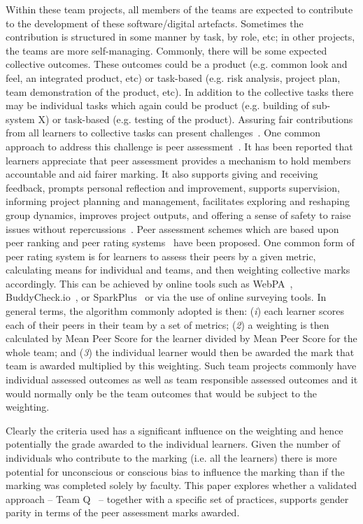 \documentclass[sigconf, anonymous=true]{acmart}
\begin{document}
Within these team projects, all members of the teams are expected to
contribute to the development of these software/digital
artefacts. Sometimes the contribution is structured in some manner by
task, by role, etc; in other projects, the teams are more
self-managing. Commonly, there will be some expected collective
outcomes. These outcomes could be a product (e.g. common look and
feel, an integrated product, etc) or task-based (e.g. risk analysis,
project plan, team demonstration of the product, etc).  In addition to
the collective tasks there may be individual tasks which again could
be product (e.g. building of sub-system X) or task-based (e.g. testing
of the product). Assuring fair contributions from all learners to
collective tasks can present challenges~\cite{Philips21}. One common
approach to address this challenge is peer
assessment~\cite{Gordon2010}. It has been reported that learners
appreciate that peer assessment provides a mechanism to hold members
accountable and aid fairer marking. It also supports giving and
receiving feedback, prompts personal reflection and improvement,
supports supervision, informing project planning and management,
facilitates exploring and reshaping group dynamics, improves project
outputs, and offering a sense of safety to raise issues without
repercussions~\cite{Mitchell2021}. Peer assessment schemes which are
based upon peer ranking and peer rating systems~\cite{Yanbin2005} have
been proposed. One common form of peer rating system is for learners
to assess their peers by a given metric, calculating means for
individual and teams, and then weighting collective marks
accordingly. This can be achieved by online tools such as
WebPA~\cite{WebPA}, BuddyCheck.io~\cite{BuddyCheck}, or
SparkPlus~\cite{SparkPlus} or via the use of online surveying
tools. In general terms, the algorithm commonly adopted is then:
({\emph{i}}) each learner scores each of their peers in their team by
a set of metrics; ({\emph{2}}) a weighting is then calculated by Mean
Peer Score for the learner divided by Mean Peer Score for the whole
team; and ({\emph{3}}) the individual learner would then be awarded
the mark that team is awarded multiplied by this weighting. Such team
projects commonly have individual assessed outcomes as well as team
responsible assessed outcomes and it would normally only be the team
outcomes that would be subject to the weighting.

Clearly the criteria used has a significant influence on the weighting
and hence potentially the grade awarded to the individual
learners. Given the number of individuals who contribute to the
marking (i.e. all the learners) there is more potential for
unconscious or conscious bias to influence the marking than if the
marking was completed solely by faculty. This paper explores whether a
validated approach -- Team Q~\cite{Britton2017} -- together with a
specific set of practices, supports gender parity in terms of the peer
assessment marks awarded.
\end{document}
